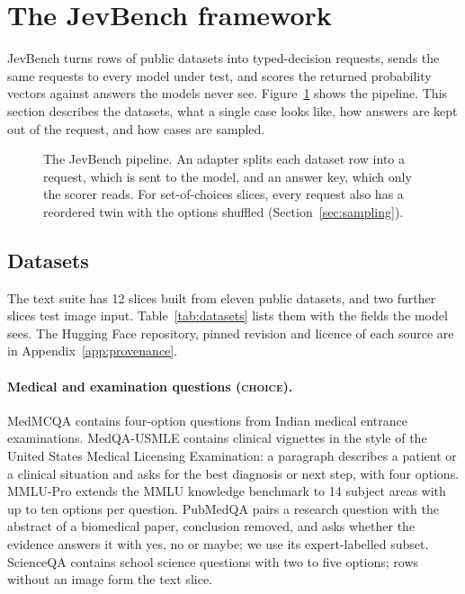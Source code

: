 \section{The JevBench framework}
\label{sec:benchmark}

JevBench turns rows of public datasets into typed-decision requests, sends the same
requests to every model under test, and scores the returned probability vectors
against answers the models never see. Figure~\ref{fig:pipeline} shows the
pipeline. This section describes the datasets, what a single case looks like, how
answers are kept out of the request, and how cases are sampled.

\begin{figure}[t]
\centering

\caption{The JevBench pipeline. An adapter splits each dataset row into a request,
which is sent to the model, and an answer key, which only the scorer reads. For
set-of-choices slices, every request also has a reordered twin with the options
shuffled (Section~\ref{sec:sampling}).}
\label{fig:pipeline}
\end{figure}

\subsection{Datasets}
\label{sec:datasets}

The text suite has 12 slices built from eleven public datasets, and two further
slices test image input. Table~\ref{tab:datasets} lists them with the fields the
model sees. The Hugging Face repository, pinned revision and licence of each
source are in Appendix~\ref{app:provenance}.

\paragraph{Medical and examination questions (\textsc{choice}).} MedMCQA
\citep{pal2022medmcqa} contains four-option questions from Indian medical
entrance examinations. MedQA-USMLE \citep{jin2020disease} contains clinical
vignettes in the style of the United States Medical Licensing Examination: a
paragraph describes a patient or a clinical situation and asks for the best
diagnosis or next step, with four options. MMLU-Pro \citep{wang2024mmlupro}
extends the MMLU knowledge benchmark to 14 subject areas with up to ten options
per question. PubMedQA \citep{jin2019pubmedqa} pairs a research question with the
abstract of a biomedical paper, conclusion removed, and asks whether the evidence
answers it with yes, no or maybe; we use its expert-labelled subset. ScienceQA
\citep{lu2022scienceqa} contains school science questions with two to five
options; rows without an image form the text slice.

